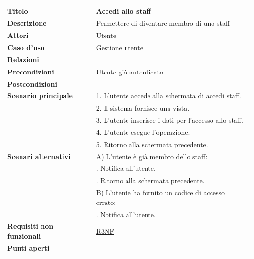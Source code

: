 \documentclass[a4paper]{article}
\begin{document}
\begin{center}
\begin{tabularx}{1\textwidth}{|l|X|}
    \hline
	\textbf{Titolo} & Accedi allo staff \\
	\hline
	\textbf{Descrizione} & Permettere di diventare membro di uno staff \\
	\hline
	\textbf{Attori} & Utente \\
	\hline
	\textbf{Caso d'uso} & Gestione utente \\
	\hline
	\textbf{Relazioni} & \\
	\hline
	\textbf{Precondizioni} & Utente già autenticato \\
	\hline
	\textbf{Postcondizioni} &  \\
	\hline
	\textbf{Scenario principale} & 1. L'utente accede alla schermata di accedi staff. \\
								 & 2. Il sistema fornisce una vista. \\
								 & 3. L'utente inserisce i dati per l'accesso allo staff. \\
								 & 4. L'utente esegue l'operazione.\\
								 & 5. Ritorno alla schermata precedente.\\
	\hline
	\textbf{Scenari alternativi} & A) L'utente è già membro dello staff:\\
								 & \quad 1. Notifica all'utente.\\
								 & \quad 2. Ritorno alla schermata precedente.\\
								 & B) L'utente ha fornito un codice di accesso errato:\\
								 & \quad 1. Notifica all'utente.\\
	\hline
	\textbf{Requisiti non funzionali} & \hyperlink{R3NF}{R3NF} \\
	\hline
	\textbf{Punti aperti} & \\
	\hline
\end{tabularx}
\end{center}


  

\end{document}

